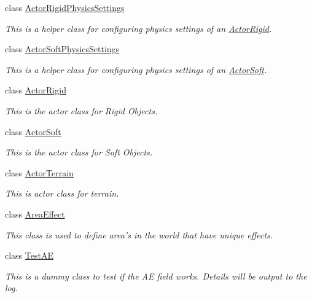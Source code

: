\begin{DoxyCompactItemize}
class \hyperlink{classphys_1_1ActorRigidPhysicsSettings}{ActorRigidPhysicsSettings}
\begin{DoxyCompactList}\small\item\em This is a helper class for configuring physics settings of an \hyperlink{classphys_1_1ActorRigid}{ActorRigid}. \item\end{DoxyCompactList}\item 
class \hyperlink{classphys_1_1ActorSoftPhysicsSettings}{ActorSoftPhysicsSettings}
\begin{DoxyCompactList}\small\item\em This is a helper class for configuring physics settings of an \hyperlink{classphys_1_1ActorSoft}{ActorSoft}. \item\end{DoxyCompactList}\item 
class \hyperlink{classphys_1_1ActorRigid}{ActorRigid}
\begin{DoxyCompactList}\small\item\em This is the actor class for Rigid Objects. \item\end{DoxyCompactList}\item 
class \hyperlink{classphys_1_1ActorSoft}{ActorSoft}
\begin{DoxyCompactList}\small\item\em This is the actor class for Soft Objects. \item\end{DoxyCompactList}\item 
class \hyperlink{classphys_1_1ActorTerrain}{ActorTerrain}
\begin{DoxyCompactList}\small\item\em This is actor class for terrain. \item\end{DoxyCompactList}\item 
class \hyperlink{classphys_1_1AreaEffect}{AreaEffect}
\begin{DoxyCompactList}\small\item\em This class is used to define area's in the world that have unique effects. \item\end{DoxyCompactList}\item 
class \hyperlink{classphys_1_1TestAE}{TestAE}
\begin{DoxyCompactList}\small\item\em This is a dummy class to test if the AE field works. Details will be output to the log. \item\end{DoxyCompactList}\item 

\end{DoxyCompactItemize}
